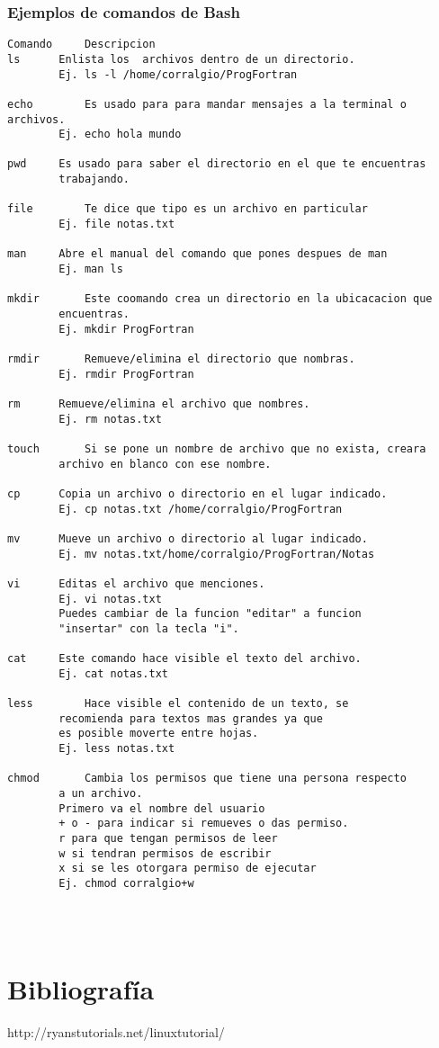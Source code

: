 \documentclass{article}
\begin{document}
\subsubsection{Ejemplos de comandos de Bash}
\begin{verbatim}
Comando		Descripcion
ls		Enlista los  archivos dentro de un directorio.
		Ej. ls -l /home/corralgio/ProgFortran

echo		Es usado para para mandar mensajes a la terminal o archivos.
		Ej. echo hola mundo

pwd		Es usado para saber el directorio en el que te encuentras
		trabajando.

file		Te dice que tipo es un archivo en particular
		Ej. file notas.txt

man		Abre el manual del comando que pones despues de man
		Ej. man ls

mkdir		Este coomando crea un directorio en la ubicacacion que
		encuentras.
		Ej. mkdir ProgFortran

rmdir		Remueve/elimina el directorio que nombras.
		Ej. rmdir ProgFortran

rm		Remueve/elimina el archivo que nombres.
		Ej. rm notas.txt

touch		Si se pone un nombre de archivo que no exista, creara
		archivo en blanco con ese nombre.

cp		Copia un archivo o directorio en el lugar indicado.
		Ej. cp notas.txt /home/corralgio/ProgFortran

mv		Mueve un archivo o directorio al lugar indicado.
		Ej. mv notas.txt/home/corralgio/ProgFortran/Notas

vi		Editas el archivo que menciones.
		Ej. vi notas.txt
		Puedes cambiar de la funcion "editar" a funcion
		"insertar" con la tecla "i".

cat		Este comando hace visible el texto del archivo.
		Ej. cat notas.txt

less		Hace visible el contenido de un texto, se
		recomienda para textos mas grandes ya que
		es posible moverte entre hojas.
		Ej. less notas.txt

chmod		Cambia los permisos que tiene una persona respecto
		a un archivo.
		Primero va el nombre del usuario
		+ o - para indicar si remueves o das permiso.
		r para que tengan permisos de leer
		w si tendran permisos de escribir
		x si se les otorgara permiso de ejecutar
		Ej. chmod corralgio+w

		
		

\end{verbatim}
\section{Bibliografía}
 http://ryanstutorials.net/linuxtutorial/ 
\end{document}
